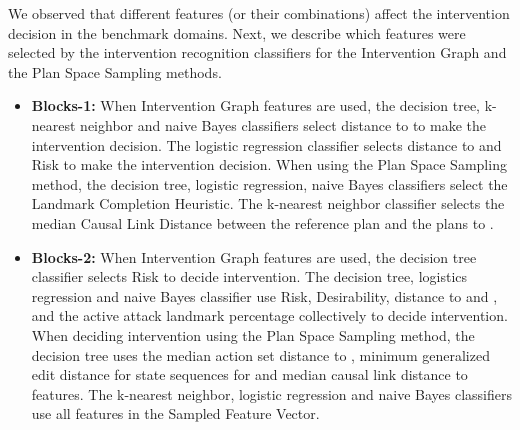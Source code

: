 We observed that different features (or their combinations) affect the intervention decision in the benchmark domains.
Next, we describe which features were selected by the intervention recognition classifiers for the Intervention Graph and the Plan Space Sampling methods.
\begin{itemize}
\item \textbf{Blocks-1:}
When Intervention Graph features are used, the decision tree, k-nearest neighbor and naive Bayes classifiers select distance to \undesired to make the intervention decision.
The logistic regression classifier selects distance to \undesired and Risk to make the intervention decision.
When using the Plan Space Sampling method, the decision tree, logistic regression, naive Bayes classifiers select the Landmark Completion Heuristic.
The k-nearest neighbor classifier selects the median Causal Link Distance between the reference plan and the plans to \undesired.
\item \textbf{Blocks-2:} 
When Intervention Graph features are used, the decision tree classifier selects Risk to decide intervention.
The decision tree, logistics regression and naive Bayes classifier use Risk, Desirability, distance to \undesired and \desired, and the active attack landmark percentage collectively to decide intervention.
When deciding intervention using the Plan Space Sampling method, the decision tree uses the median action set distance to \undesired, minimum generalized edit distance for state sequences for \undesired and median causal link distance to \desired features.
The k-nearest neighbor, logistic regression and naive Bayes classifiers use all features in the Sampled Feature Vector.


\end{itemize}
